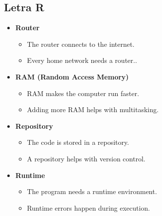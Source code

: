     \subsection{Letra R}
    \begin{itemize}
        \item \textbf{Router}
        \begin{itemize}
            \item The router connects to the internet.
            \item Every home network needs a router..
        \end{itemize}
        \item \textbf{RAM (Random Access Memory)}
        \begin{itemize}
            \item RAM makes the computer run faster.
            \item Adding more RAM helps with multitasking.
        \end{itemize}
        \item \textbf{Repository}
        \begin{itemize}
            \item The code is stored in a repository.
            \item A repository helps with version control.
        \end{itemize}
        \item \textbf{Runtime}
        \begin{itemize}
            \item The program needs a runtime environment.
            \item Runtime errors happen during execution.
        \end{itemize}
    \end{itemize}
